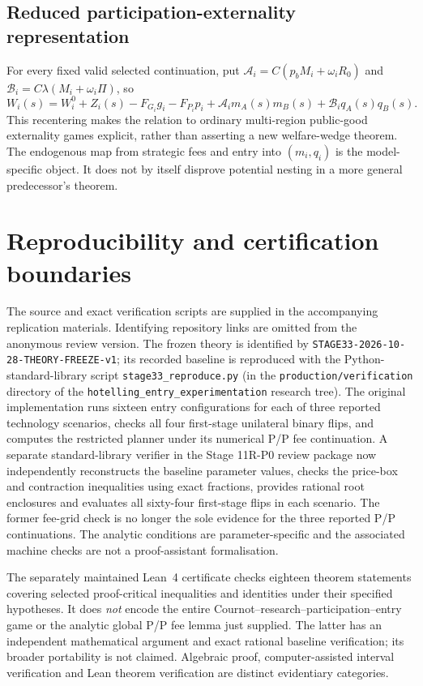 \documentclass[11pt]{article}
\begin{document}
\subsection{Reduced participation-externality representation}
For every fixed valid selected continuation, put
$\mathcal A_i=C(p_bM_i+\omega_iR_0)$ and $\mathcal B_i=C\lambda(M_i+\omega_i\Pi)$, so
\begin{equation}
 W_i(s)=W_i^0+Z_i(s)-F_{G_i}g_i-F_{P_i}p_i
       +\mathcal A_i m_A(s)m_B(s)
       +\mathcal B_iq_A(s)q_B(s).
\end{equation}
This recentering makes the relation to ordinary multi-region public-good externality games explicit, rather than asserting a new welfare-wedge theorem. The endogenous map from strategic fees and entry into $(m_i,q_i)$ is the model-specific object. It does not by itself disprove potential nesting in a more general predecessor's theorem.

\section{Reproducibility and certification boundaries}\label{app:repro}
The source and exact verification scripts are supplied in the accompanying replication materials.
Identifying repository links are omitted from the anonymous review version.
The frozen theory is identified by \texttt{STAGE33-2026-10-28-THEORY-FREEZE-v1};
its recorded baseline is reproduced with the Python-standard-library script \texttt{stage33\_reproduce.py}
(in the \texttt{production/verification} directory of the
\texttt{hotelling\_entry\_experimentation} research tree).
The original implementation runs sixteen entry configurations for each of three reported technology scenarios, checks all four first-stage unilateral binary flips, and computes the restricted planner under its numerical P/P fee continuation. A separate standard-library verifier in the Stage 11R-P0 review package now independently reconstructs the baseline parameter values, checks the price-box and contraction inequalities using exact fractions, provides rational root enclosures and evaluates all sixty-four first-stage flips in each scenario. The former fee-grid check is no longer the sole evidence for the three reported P/P continuations. The analytic conditions are parameter-specific and the associated machine checks are not a proof-assistant formalisation.

The separately maintained Lean~4 certificate checks eighteen theorem statements covering selected proof-critical inequalities and identities under their specified hypotheses. It does \emph{not} encode the entire Cournot--research--participation--entry game or the analytic global P/P fee lemma just supplied. The latter has an independent mathematical argument and exact rational baseline verification; its broader portability is not claimed. Algebraic proof, computer-assisted interval verification and Lean theorem verification are distinct evidentiary categories.
\end{document}
